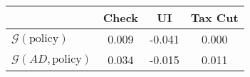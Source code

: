 \begin{tabular}{@{}lccc@{}}
\toprule
                          & Check      & UI    & Tax Cut    \\  \midrule
$\mathcal{G}(\text{policy})$ & 0.009  & -0.041  & 0.000     \\
$\mathcal{G}(AD,\text{policy})$ & 0.034  & -0.015  & 0.011     \\
\end{tabular}
